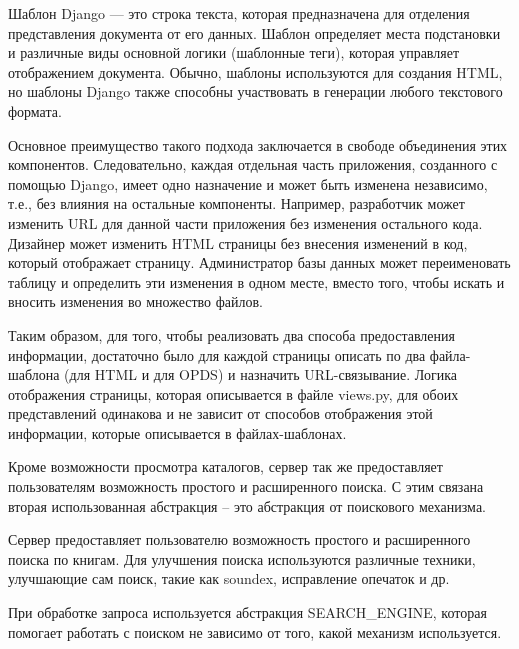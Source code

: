 \documentclass[a4paper]{report}
\begin{document}
Шаблон Django — это строка текста, которая предназначена для отделения представления документа от его данных. Шаблон определяет места подстановки и различные виды основной логики (шаблонные теги), которая управляет отображением документа. Обычно, шаблоны используются для создания HTML, но шаблоны Django также способны участвовать в генерации любого текстового формата.

Основное преимущество такого подхода заключается в свободе объединения этих компонентов. Следовательно, каждая отдельная часть приложения, созданного с помощью Django, имеет одно назначение и может быть изменена независимо, т.е., без влияния на остальные компоненты. Например, разработчик может изменить URL для данной части приложения без изменения остального кода. Дизайнер может изменить HTML страницы без внесения изменений в код, который отображает страницу. Администратор базы данных может переименовать таблицу и определить эти изменения в одном месте, вместо того, чтобы искать и вносить изменения во множество файлов.

Таким образом, для того, чтобы реализовать два способа предоставления информации, достаточно было для каждой страницы описать по два файла-шаблона (для HTML и для OPDS) и назначить URL-связывание. Логика отображения страницы, которая описывается в файле views.py, для обоих представлений одинакова и не зависит от способов отображения этой информации, которые описывается в файлах-шаблонах.

Кроме возможности просмотра каталогов, сервер так же предоставляет пользователям возможность простого и расширенного поиска. С этим связана вторая использованная абстракция -- это абстракция от поискового механизма. 

Сервер предоставляет пользователю возможность простого и расширенного поиска по книгам. Для улучшения поиска используются различные техники, улучшающие сам поиск, такие как soundex, исправление опечаток и др. %

При обработке запроса используется абстракция SEARCH\_ENGINE, которая помогает работать с поиском не зависимо от того, какой механизм используется.

\end{document}
